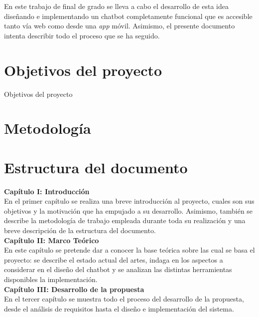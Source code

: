 En este trabajo de final de grado se lleva a cabo el desarrollo de esta idea diseñando e implementando un chatbot completamente funcional que es accesible tanto vía web como desde una \textit{app} móvil. Asimismo, el presente documento intenta describir todo el proceso que se ha seguido.



\section{Objetivos del proyecto}
Objetivos del proyecto

\section{Metodología}


\section{Estructura del documento}
\noindent \textbf{Capítulo I: Introducción}\\
En el primer capítulo se realiza una breve introducción al proyecto, cuales son sus objetivos y la motivación que ha empujado a su desarrollo. Asimismo, también se describe la metodología de trabajo empleada durante toda su realización y una breve descripción de la estructura del documento.  \\

\noindent \textbf{Capítulo II: Marco Teórico}\\
En este capítulo se pretende dar a conocer la base teórica sobre las cual se basa el proyecto: se describe el estado actual del artes, indaga en los aspectos a considerar en el diseño del chatbot y se analizan las distintas herramientas disponibles la implementación.\\

\noindent \textbf{Capítulo III: Desarrollo de la propuesta}\\
En el tercer capítulo se muestra todo el proceso del desarrollo de la propuesta, desde el análisis de requisitos hasta el diseño e implementación del sistema. \\


